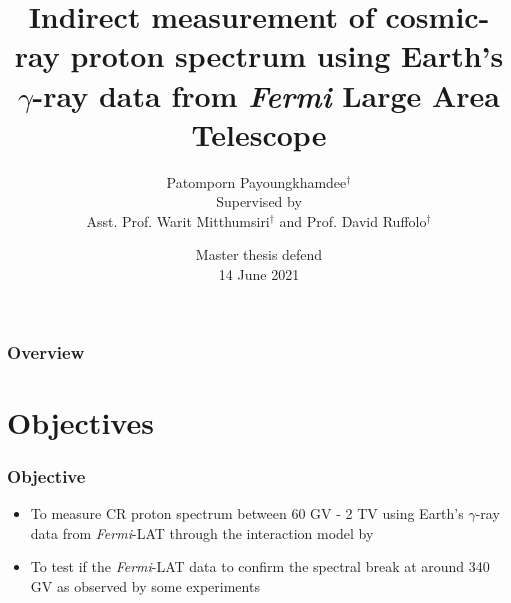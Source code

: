 \documentclass{beamer}
\title[CR proton from $\gamma$-ray Earth's Limb]{Indirect measurement of cosmic-ray proton spectrum using Earth's $\gamma$-ray data from {\it Fermi} Large Area Telescope }
\author[P. Payoungkhamdee]{
  Patomporn Payoungkhamdee$^{\dagger}$ \\
  {
    \small Supervised by \\
    Asst. Prof. Warit Mitthumsiri$^{\dagger}$ and Prof. David Ruffolo$^{\dagger}$
  }
} %
\institute[MU] %
{
  $^{\dagger}$Department of Physics, Faculty of Science, Mahidol University \\ %
\medskip
\textit{patomporn.pay@gmail.com} %

}
\date[14 June 2021]{Master thesis defend \\ 14 June 2021} %
\newcommand{\nologo}{\setbeamertemplate{logo}{}}
\begin{document}
{\nologo
\begin{frame}
\titlepage %
\end{frame}
}

\begin{frame}
\frametitle{Overview} %
\tableofcontents %
\end{frame}



\section{Objectives}

\begin{frame}
\frametitle{Objective}
\begin{itemize}
  \item To measure CR proton spectrum between 60 GV - 2 TV using
  Earth's $\gamma$-ray data from \textit{Fermi}-LAT
  through the interaction model by \cite{K&Omodel}
  \item To test if the \textit{Fermi}-LAT data to confirm the
  spectral break at around 340 GV as observed by some experiments
\end{itemize}
\end{frame}


\end{document}
